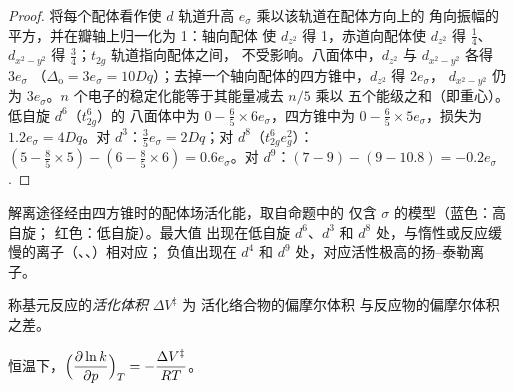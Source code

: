 \begin{proof}
将每个配体看作使 $d$ 轨道升高 $e_\sigma$ 乘以该轨道在配体方向上的
角向振幅的平方，并在瓣轴上归一化为 1：轴向配体
使 $d_{z^2}$ 得 1，赤道向配体使 $d_{z^2}$ 得 $\frac14$、$d_{x^2-y^2}$ 得 $\frac34$；$t_{2g}$ 轨道指向配体之间，
不受影响。八面体中，$d_{z^2}$ 与 $d_{x^2-y^2}$ 各得 $3e_\sigma$
（$\Delta_{\mathrm o} = 3e_\sigma = 10Dq$）；去掉一个轴向配体的四方锥中，$d_{z^2}$ 得 $2e_\sigma$，
$d_{x^2-y^2}$ 仍为 $3e_\sigma$。$n$ 个电子的稳定化能等于其能量减去 $n/5$ 乘以
五个能级之和（即重心）。低自旋 $d^6$（$t_{2g}^6$）的
八面体中为 $0 - \frac65 \times 6e_\sigma$，四方锥中为 $0 - \frac65 \times 5e_\sigma$，损失为 $1.2e_\sigma = 4Dq$。对 $d^3$：$\frac35e_\sigma =
2Dq$；对 $d^8$（$t_{2g}^6e_g^2$）：$(5 - \frac85 \times 5) - (6 - \frac85 \times 6) = 0.6e_\sigma$。对 $d^9$：$(7 - 9) - (9 -
10.8) = -0.2e_\sigma$.
\end{proof}

\begin{omfigure}

{\small 解离途径经由四方锥时的配体场活化能，取自命题中的
仅含 $\sigma$ 的模型（蓝色：高自旋；
红色：低自旋）。最大值
出现在低自旋 $d^6$、$d^3$ 和 $d^8$ 处，与惰性或反应缓慢的离子（、、）相对应；
负值出现在 $d^4$ 和 $d^9$ 处，对应活性极高的扬–泰勒离子。}
\end{omfigure}

\begin{definition}[活化体积]\label{def:b3:complex-mechanisms:activation-volume}
称基元反应的\emph{活化体积} $\Delta V^{\ddagger}$ 为
活化络合物的偏摩尔体积
与反应物的偏摩尔体积之差。
\end{definition}

\begin{proposition}[速率常数的压强依赖性]\label{prop:b3:complex-mechanisms:pressure}
恒温下，$\displaystyle\Bigl(\frac{\partial\ln k}{\partial p}\Bigr)_T = -\frac{\Delta V^{\ddagger}}{RT}$。
\end{proposition}


